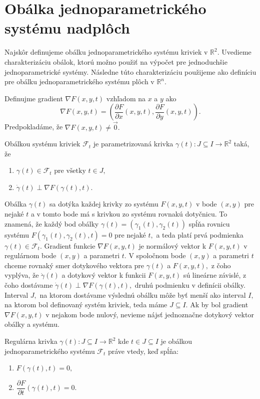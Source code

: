 \section{Obálka jednoparametrického systému nadplôch}
Najskôr definujeme obálku jednoparametrického systému kriviek v $\mathbb{R}^2$. Uvedieme charakterizáciu obálok, ktorú možno použiť na výpočet pre jednoduchšie jednoparametrické systémy. Následne túto charakterizáciu použijeme ako definíciu pre obálku jednoparametrického systému plôch v $\mathbb{R}^n$.

Definujme gradient $\nabla F(x,y,t) $ vzhľadom na $x$ a $y$ ako
$$\nabla F(x, y, t) = \left(\frac{\partial F}{\partial x}(x, y, t), \frac{\partial F}{\partial y}(x, y, t) \right).$$ Predpokladáme, že $\nabla F(x,y,t) \neq \vec{0}. $ 

\begin{definition}
Obálkou systému kriviek $ \mathcal{F}_{t} $ je parametrizovaná krivka $\gamma(t) \colon J \subseteq I \rightarrow \mathbb{R}^{2}$ taká, že 
\begin{enumerate}
\item $\gamma(t) \in \mathcal{F}_{t} \text{ pre všetky } t \in J,$
\item $\dot{\gamma}(t) \perp \nabla F \left( \gamma(t), t \right).$
\end{enumerate}
\end{definition}

Obálka $\gamma(t)$ sa dotýka každej krivky zo systému $F(x,y,t)$ v bode $(x, y)$  pre nejaké $t$ a v tomto bode má s krivkou zo systému rovnakú dotyčnicu. To znamená, že každý bod obálky ${\gamma}(t) = (\gamma_{1}(t),\gamma_{2}(t))$ spĺňa rovnicu systému $F(\gamma_{1}(t),\gamma_{2}(t),t)=0$ pre nejaké $t,$ a teda platí prvá podmienka $\gamma(t) \in \mathcal{F}_{t}$. Gradient funkcie $ \nabla F(x,y,t)$ je normálový vektor k $F(x,y,t)$ v regulárnom bode $(x,y)$ a parametri $t$. V spoločnom bode $(x,y)$ a parametri $t$ chceme rovnaký smer dotykového vektora pre $\gamma(t)$ a $F(x,y,t), $ z čoho vyplýva, že $\dot{\gamma}(t)$ a dotykový vektor k funkcii $F(x,y,t)$ sú lineárne závislé, z čoho dostávame $\dot{\gamma}(t) \perp \nabla F \left( \gamma(t), t \right), $ druhú podmienku v definícii obálky. Interval $J,$ na ktorom dostávame výslednú obálku môže byť menší ako interval $I,$ na ktorom bol definovaný systém kriviek, teda máme $J \subseteq I.$ Ak by bol gradient $\nabla F(x,y,t) $ v nejakom bode nulový, nevieme nájsť jednoznačne dotykový vektor obálky a systému. 

\begin{theorem}
Regulárna krivka $\gamma(t) \colon J \subseteq I \rightarrow \mathbb{R}^{2}$ kde $t \in J  \subseteq I$ je obálkou jednoparametrického systému $\mathcal{F}_{t}$ práve vtedy, keď spĺňa:
\begin{enumerate}
\item $F(\gamma(t), t) = 0, $ 
\item $\dfrac{\partial F}{\partial t}(\gamma(t), t) = 0.$
\end{enumerate}
\end{theorem}

